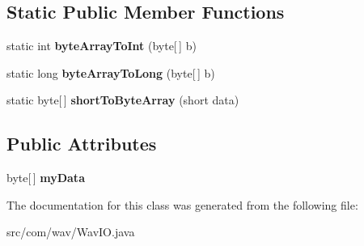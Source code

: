 \subsection*{Static Public Member Functions}
\begin{DoxyCompactItemize}
\item 
\hypertarget{classcom_1_1wav_1_1_wav_i_o_aa6906f9503ee02b7f9722f635d2cb581}{}static int {\bfseries byte\+Array\+To\+Int} (byte\mbox{[}$\,$\mbox{]} b)\label{classcom_1_1wav_1_1_wav_i_o_aa6906f9503ee02b7f9722f635d2cb581}

\item 
\hypertarget{classcom_1_1wav_1_1_wav_i_o_a4abccfbfe2c9d49da330bc21c5c0272f}{}static long {\bfseries byte\+Array\+To\+Long} (byte\mbox{[}$\,$\mbox{]} b)\label{classcom_1_1wav_1_1_wav_i_o_a4abccfbfe2c9d49da330bc21c5c0272f}

\item 
\hypertarget{classcom_1_1wav_1_1_wav_i_o_a8dcd8c2ff6c82b006630950817c38b71}{}static byte\mbox{[}$\,$\mbox{]} {\bfseries short\+To\+Byte\+Array} (short data)\label{classcom_1_1wav_1_1_wav_i_o_a8dcd8c2ff6c82b006630950817c38b71}

\end{DoxyCompactItemize}
\subsection*{Public Attributes}
\begin{DoxyCompactItemize}
\item 
\hypertarget{classcom_1_1wav_1_1_wav_i_o_a6fb9e5ff2853a8fd3e244ce5a77b258e}{}byte\mbox{[}$\,$\mbox{]} {\bfseries my\+Data}\label{classcom_1_1wav_1_1_wav_i_o_a6fb9e5ff2853a8fd3e244ce5a77b258e}

\end{DoxyCompactItemize}


The documentation for this class was generated from the following file\+:\begin{DoxyCompactItemize}
\item 
src/com/wav/Wav\+I\+O.\+java\end{DoxyCompactItemize}
